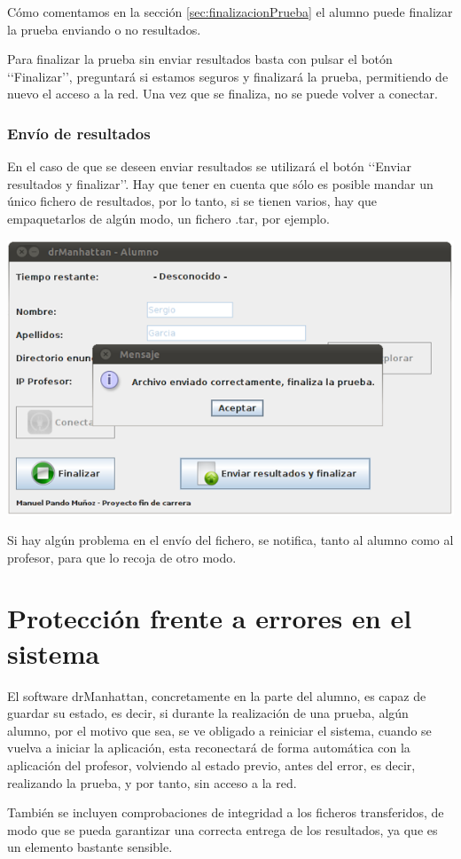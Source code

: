 \documentclass[11pt]{article}
\begin{document}
Cómo comentamos en la sección \ref{sec:finalizacionPrueba} el alumno puede finalizar la prueba enviando o no resultados.

Para finalizar la prueba sin enviar resultados basta con pulsar el botón \lq\lq Finalizar\rq\rq, preguntará si estamos seguros y finalizará la prueba, permitiendo de nuevo el acceso a la red. Una vez que se finaliza, no se puede volver a conectar.

\subsubsection{Envío de resultados}
\label{sec:finResultados}

En el caso de que se deseen enviar resultados se utilizará el botón \lq\lq Enviar resultados y finalizar\rq\rq. Hay que tener en cuenta que sólo es posible mandar un único fichero de resultados, por lo tanto, si se tienen varios, hay que empaquetarlos de algún modo, un fichero .tar, por ejemplo.

\begin{center}
    \includegraphics[width=.90\linewidth]{imagenes/finResCorrecto}
\end{center}

Si hay algún problema en el envío del fichero, se notifica, tanto al alumno como al profesor, para que lo recoja de otro modo.


\newpage
\section{Protección frente a errores en el sistema}

El software drManhattan, concretamente en la parte del alumno, es capaz de guardar su estado, es decir, si durante la realización de una prueba, algún alumno, por el motivo que sea, se ve obligado a reiniciar el sistema, cuando se vuelva a iniciar la aplicación, esta reconectará de forma automática con la aplicación del profesor, volviendo al estado previo, antes del error, es decir, realizando la prueba, y por tanto, sin acceso a la red. 
\newline

También se incluyen comprobaciones de integridad a los ficheros transferidos, de modo que  se pueda garantizar una correcta entrega de los resultados, ya que es un elemento bastante sensible.
\end{document}
